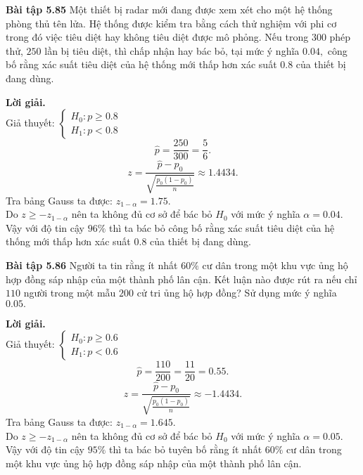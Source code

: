 \begin{mybox}
\textbf{Bài tập 5.85} Một thiết bị radar mới đang được xem xét cho một hệ thống phòng thủ tên lửa. Hệ thống được kiểm tra bằng cách thử nghiệm với phi cơ trong đó việc tiêu diệt hay không tiêu diệt được mô phỏng. Nếu trong $300$ phép thử, $250$ lần bị tiêu diệt, thì chấp nhận hay bác bỏ, tại mức ý nghĩa $0.04,$ công bố rằng xác suất tiêu diệt của hệ thống mới thấp hơn xác suất $0.8$ của thiết bị đang dùng.  
\end{mybox}
\textbf{Lời giải.}\\
Giả thuyết: $\begin{cases}
H_0: p \geqslant 0.8\\
H_1: p < 0.8
\end{cases}$\\
$$\widehat{p} = \frac{250}{300} = \frac{5}{6}.$$
$$z = \frac{{\widehat p - {p_0}}}{{\sqrt {\frac{{{p_0}\left( {1 - {p_0}} \right)}}{n}} }} \approx 1.4434.$$
Tra bảng Gauss ta được: $z_{1 - \alpha} = 1.75.$\\
Do $z \geqslant - z_{1 - \alpha}$ nên ta không đủ cơ sở để bác bỏ $H_0$ với mức ý nghĩa $\alpha = 0.04.$\\
Vậy với độ tin cậy $96\%$ thì ta bác bỏ công bố rằng xác suất tiêu diệt của hệ thống mới thấp hơn xác suất $0.8$ của thiết bị đang dùng.  

\begin{mybox}
\textbf{Bài tập 5.86} Người ta tin rằng ít nhất $60\%$ cư dân trong một khu vực ủng hộ hợp đồng sáp nhập của một thành phố lân cận. Kết luận nào được rút ra nếu chỉ $110$ người trong một mẫu $200$ cử tri ủng hộ hợp đồng? Sử dụng mức ý nghĩa $0.05.$
\end{mybox}
\textbf{Lời giải.}\\
Giả thuyết: $\begin{cases}
H_0: p \geqslant 0.6\\
H_1: p < 0.6
\end{cases}$\\
$$\widehat{p} = \frac{110}{200} = \frac{11}{20} = 0.55.$$
$$z = \frac{{\widehat p - {p_0}}}{{\sqrt {\frac{{{p_0}\left( {1 - {p_0}} \right)}}{n}} }} \approx -1.4434.$$
Tra bảng Gauss ta được: $z_{1 - \alpha} = 1.645.$\\
Do $z \geqslant - z_{1 - \alpha}$ nên ta không đủ cơ sở để bác bỏ $H_0$ với mức ý nghĩa $\alpha = 0.05.$\\
Vậy với độ tin cậy $95\%$ thì ta bác bỏ tuyên bố rằng ít nhất $60\%$ cư dân trong một khu vực ủng hộ hợp đồng sáp nhập của một thành phố lân cận.

